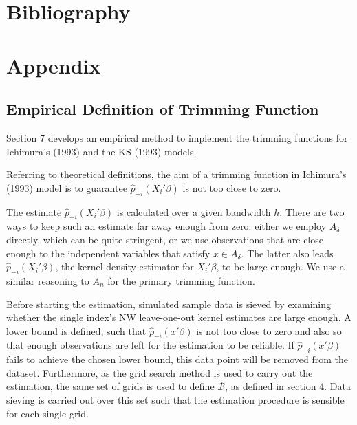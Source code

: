 \newpage 



\section{Bibliography} %
\printbibliography


\newpage 

\section{Appendix}
\label{sec:appendix}


\subsection{Empirical Definition of Trimming Function}
Section 7 develops an empirical method to implement the trimming functions for Ichimura's (1993) \cite{[6]} and the KS (1993) \cite{[12]} models.

Referring to theoretical definitions, the aim of a trimming function in Ichimura's (1993) \cite{[6]} model is to guarantee $\hat{p}_{-i}(X_i'\beta)$ is not too close to zero. 

The estimate $\hat{p}_{-i}(X_i'\beta)$ is calculated over a given bandwidth $h$. There are two ways to keep such an estimate far away enough from zero: either we  employ $A_\delta$  directly, which can be quite stringent, or we use observations that are close enough to the independent variables that satisfy $x \in A_\delta$. The latter also leads $\hat{p}_{-i}(X_i'\beta)$, the kernel density estimator for $X_i'\beta$, to be large enough. We use a similar reasoning to $A_n$ for the primary trimming function.

Before starting the estimation, simulated sample data is sieved by examining whether the single index's NW leave-one-out kernel estimates are large enough. A lower bound is defined, such that $\hat{p}_{-i}(x'\beta)$ is not too close to zero and also so that enough observations are left  for the estimation to be reliable. If $\hat{p}_{-i}(x'\beta)$ fails to achieve the chosen lower bound, this data point will be removed from the dataset.
Furthermore, as the grid search method is used to carry out the estimation, the same set of grids is used to define $\mathcal{B}$, as defined in section 4. Data sieving is carried out over this set such that the estimation procedure is sensible for each single grid.

